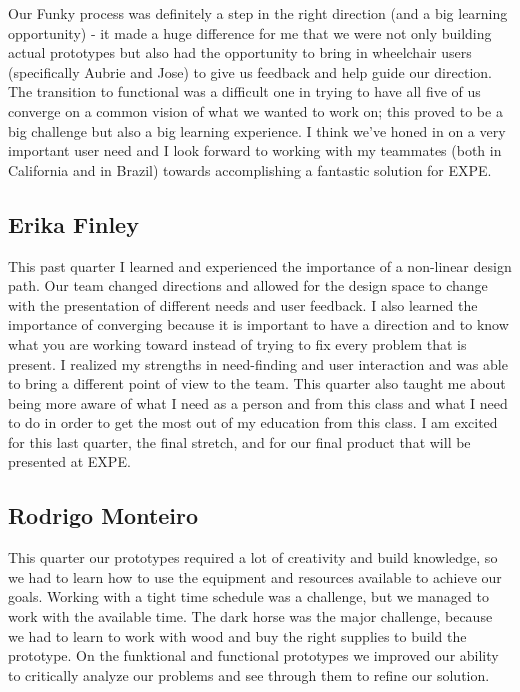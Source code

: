 Our Funky process was definitely a step in the right direction (and a big learning opportunity) - it made a huge difference for me that we were not only building actual prototypes but also had the opportunity to bring in wheelchair users (specifically Aubrie and Jose) to give us feedback and help guide our direction. The transition to functional was a difficult one in trying to have all five of us converge on a common vision of what we wanted to work on; this proved to be a big challenge but also a big learning experience. I think we've honed in on a very important user need and I look forward to working with my teammates (both in California and in Brazil) towards accomplishing a fantastic solution for EXPE.

\subsection{Erika Finley}
This past quarter I learned and experienced the importance of a non-linear design path.  Our team changed directions and allowed for the design space to change with the presentation of different needs and user feedback.  I also learned the importance of converging because it is important to have a direction and to know what you are working toward instead of trying to fix every problem that is present. I realized my strengths in need-finding and user interaction and was able to bring a different point of view to the team.  This quarter also taught me about being more aware of what I need as a person and from this class and what I need to do in order to get the most out of my education from this class.  I am excited for this last quarter, the final stretch, and for our final product that will be presented at EXPE. 

\subsection{Rodrigo Monteiro}
This quarter our prototypes required a lot of creativity and build knowledge, so we had to learn how to use the equipment and resources available to achieve our goals. Working with a tight time schedule was a challenge, but we managed to work with the available time. The dark horse was the major challenge, because we had to learn to work with wood and buy the right supplies to build the prototype. On the funktional and functional prototypes we improved our ability to critically analyze our problems and see through them to refine our solution.

